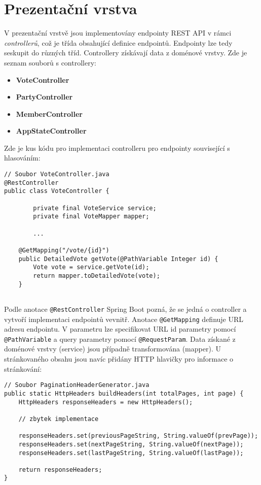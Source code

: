 \section {Prezentační vrstva}
V prezentační vrstvě jsou implementovány endpointy REST API v rámci \textit{controllerů}, což je třída obsahující definice endpointů. Endpointy lze tedy seskupit do různých tříd. Controllery získávají data z doménové vrstvy. Zde je seznam souborů s controllery:

\begin{itemize}
	\item \textbf{VoteController}
	\item \textbf{PartyController}
	\item \textbf{MemberController}
	\item \textbf{AppStateController}
\end{itemize}

\noindent Zde je kus kódu pro implementaci controlleru pro endpointy související s hlasováním:

\begin{lstlisting}[caption={Ukázka kódu pro vytvoření endpointu}, label={lst:controller-votes}, tabsize=2]
// Soubor VoteController.java
@RestController
public class VoteController {
		
		private final VoteService service;
		private final VoteMapper mapper;
		
		...
		
	@GetMapping("/vote/{id}")
	public DetailedVote getVote(@PathVariable Integer id) {
		Vote vote = service.getVote(id);
		return mapper.toDetailedVote(vote);
	}
		
\end{lstlisting}

\noindent Podle anotace \lstinline|@RestController| Spring Boot pozná, že se jedná o controller a vytvoří implementaci endpointů vevnitř. Anotace \lstinline|@GetMapping| definuje URL adresu endpointu. V parametru lze specifikovat URL id parametry pomocí \lstinline{@PathVariable} a query parametry pomocí \lstinline|@RequestParam|. Data získané z doménové vrstvy (service) jsou případně transformována (mapper). U stránkovaného obsahu jsou navíc přidány HTTP hlavičky pro informace o stránkování:

\begin{lstlisting}[caption={Ukázka nastavení hlaviček pro stránkování}, label={lst:headers-paging}, tabsize=2]
// Soubor PaginationHeaderGenerator.java
public static HttpHeaders buildHeaders(int totalPages, int page) {
	HttpHeaders responseHeaders = new HttpHeaders();

	// zbytek implementace
	
	responseHeaders.set(previousPageString, String.valueOf(prevPage));
	responseHeaders.set(nextPageString, String.valueOf(nextPage));
	responseHeaders.set(lastPageString, String.valueOf(lastPage));
	
	return responseHeaders;
}
\end{lstlisting}

